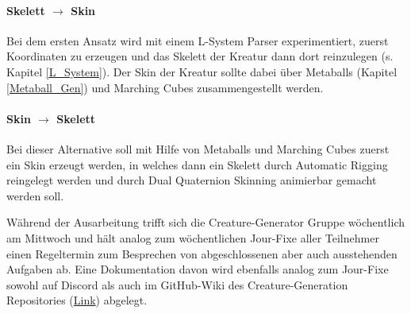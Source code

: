 \paragraph{Skelett $\rightarrow$ Skin} Bei dem ersten Ansatz wird mit einem L-System Parser experimentiert, zuerst Koordinaten zu erzeugen und das Skelett der Kreatur dann dort reinzulegen (s. Kapitel \ref{L_System}). Der Skin der Kreatur sollte dabei über Metaballs (Kapitel \ref{Metaball_Gen}) und Marching Cubes \cite{marching_cubes} zusammengestellt werden.

\paragraph{Skin $\rightarrow$ Skelett} Bei dieser Alternative soll mit Hilfe von Metaballs und Marching Cubes zuerst ein Skin erzeugt werden, in welches dann ein Skelett durch Automatic Rigging reingelegt werden und durch Dual Quaternion Skinning animierbar gemacht werden soll. 

Während der Ausarbeitung trifft sich die Creature-Generator Gruppe wöchentlich am Mittwoch und hält analog zum wöchentlichen Jour-Fixe aller Teilnehmer einen Regeltermin zum Besprechen von abgeschlossenen aber auch ausstehenden Aufgaben ab. Eine Dokumentation davon wird ebenfalls analog zum Jour-Fixe sowohl auf Discord als auch im GitHub-Wiki des Creature-Generation Repositories (\href{https://github.com/PG649-3D-RPG/Creature-Generation/wiki/Mittwochs-Dokumentationen-CG}{Link}) abgelegt. 

